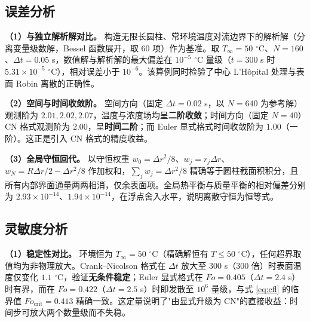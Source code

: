 \documentclass[12pt,a4paper]{ctexart}
\begin{document}
\subsection{误差分析}
\textbf{（1）与独立解析解对比。} 构造无限长圆柱、常环境温度对流边界下的解析解（分离变量级数解，Bessel 函数展开，取 60 项）作为基准。取 $T_\infty=50$ $^\circ$C、$N=160$、$\Delta t=0.05$ s，数值解与解析解的最大偏差在 $10^{-5}$ $^\circ$C 量级（$t=300$ s 时 $5.31\times10^{-5}$ $^\circ$C），相对误差小于 $10^{-6}$。该算例同时检验了中心 L'H\^opital 处理与表面 Robin 离散的正确性。

\textbf{（2）空间与时间收敛阶。} 空间方向（固定 $\Delta t=0.02$ s，以 $N=640$ 为参考解）观测阶为 $2.01,2.02,2.07$，温度与浓度场均呈\textbf{二阶收敛}；时间方向（固定 $N=40$）CN 格式观测阶为 $2.00$，呈\textbf{时间二阶}；而 Euler 显式格式时间收敛阶为 $1.00$（一阶）。这正是引入 CN 格式的精度收益。

\textbf{（3）全局守恒回代。} 以守恒权重 $w_0=\Delta r^2/8$、$w_j=r_j\Delta r$、$w_N=R\Delta r/2-\Delta r^2/8$ 作加权和，$\sum_j w_j=\Delta r^2/8$ 精确等于圆柱截面积积分，且所有内部界面通量两两相消，仅余表面项。全局热平衡与质量平衡的相对偏差分别为 $2.93\times10^{-14}$、$1.94\times10^{-14}$，在浮点舍入水平，说明离散守恒为恒等式。

\subsection{灵敏度分析}
\textbf{（1）稳定性对比。} 环境恒为 $T_\infty=50$ $^\circ$C（精确解恒有 $T\le50$ $^\circ$C），任何超界取值均为非物理放大。Crank--Nicolson 格式在 $\Delta t$ 放大至 $300$ s（$300$ 倍）时表面温度仅变化 $1.1$ $^\circ$C，验证\textbf{无条件稳定}；Euler 显式格式在 $Fo=0.405$（$\Delta t=2.4$ s）时有界，而在 $Fo=0.422$（$\Delta t=2.5$ s）时即发散至 $10^6$ 量级，与式 \eqref{eq:cfl} 的临界值 $Fo_{\text{crit}}=0.413$ 精确一致。这定量说明了"由显式升级为 CN"的直接收益：时间步可放大两个数量级而不失稳。

\begin{table}[H]
\centering
\caption{显式与隐式格式的稳定性对比（$N=20$，$t_{\text{end}}=1800$ s）}
\label{tab:stability}
\end{table}
\end{document}
